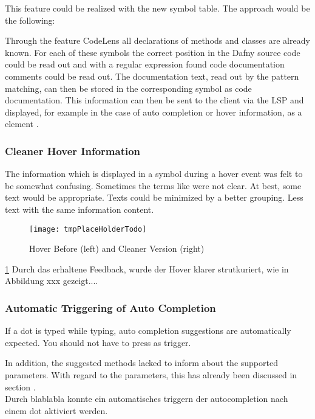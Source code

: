 This feature could be realized with the new symbol table. The approach would be the following:

Through the feature CodeLens all declarations of methods and classes are already known.
For each of these symbols the correct position in the Dafny source code could be read out
and with a regular expression found code documentation comments could be read out.
The documentation text, read out by the pattern matching, can then be stored in the corresponding symbol as code documentation.
This information can then be sent to the client via the LSP and displayed,
for example in the case of auto completion or hover information,
as a  element \cite{vscodeAPI}.

\subsubsection{Cleaner Hover Information}
The information which is displayed in a symbol during a hover event was felt to be somewhat confusing.
Sometimes the terms like  were not clear.
At best, some text would be appropriate.
Texts could be minimized by a better grouping.
Less text with the same information content.\\

\begin{figure}[H]
    \centering
    \texttt{[image: tmpPlaceHolderTodo]}
    \caption{Hover Before (left) and Cleaner Version (right)}
    \label{fig:placeholder_ref}
\end{figure}

\ref{fig:placeholder_ref}
Durch das erhaltene Feedback, wurde der Hover klarer strutkuriert, wie in Abbildung xxx gezeigt....

\subsubsection{Automatic Triggering of Auto Completion}
If a dot is typed while typing, auto completion suggestions are automatically expected.
You should not have to press  as trigger.

In addition, the suggested methods lacked to inform about the supported parameters.
With regard to the parameters, this has already been discussed in section  . \\

Durch blablabla konnte ein automatisches triggern der autocompletion nach einem dot aktiviert werden.

